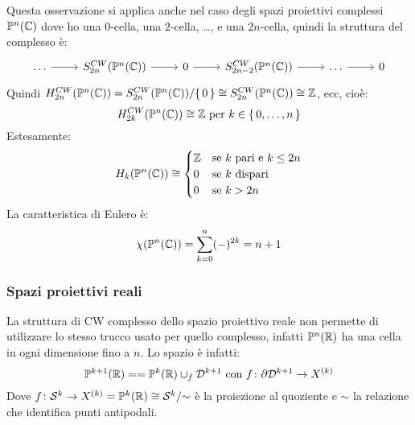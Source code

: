 Questa osservazione si applica anche nel caso degli spazi
proiettivi complessi $ \mathbb{P}^{n} (\mathbb{C}) $ dove ho una $ 0 $-cella, una $ 2 $-cella, \dots, e
una $ 2n $-cella, quindi la struttura del complesso è:
\[
  \begin{tikzcd}
    \dots \rar & S^{CW}_{2n}(\Pjc{n}) \rar & 0 \rar & S_{2n - 2}^{CW}(\Pjc{n}) \rar & \dots \rar & 0
  \end{tikzcd}
\]
Quindi $ H_{2n}^{CW}(\mathbb{P}^{n} (\mathbb{C})) = {S^{CW}_{2n}(\mathbb{P}^{n} (\mathbb{C}))} \slash {\set{0}} \cong S_{2n}^{CW}(\mathbb{P}^{n} (\mathbb{C})) \cong \mathbb{Z} $,
ecc, cioè:
\[
  H_{2k}^{CW}(\mathbb{P}^{n} (\mathbb{C})) \cong \mathbb{Z} \text{ per } k \in \set{0, \dots, n}
\]
Estesamente:
\[
  H_k(\mathbb{P}^{n} (\mathbb{C})) \cong
  \begin{cases}
    \mathbb{Z} & \text{se $ k $ pari e $ k \leq 2n $} \\
    0  & \text{se $ k $ dispari} \\
    0  & \text{se $ k > 2n $ }
  \end{cases}
\]
La caratteristica di Eulero è:
\[
  \chi(\mathbb{P}^{n} (\mathbb{C})) = \sum_{k=0}^n (-)^{2k} = n + 1
\]
\subsubsection{Spazi proiettivi reali}
La struttura di CW complesso dello spazio proiettivo reale non permette
di utilizzare lo stesso trucco usato per quello complesso, infatti $ \mathbb{P}^{n} (\mathbb{R}) $
ha una cella in ogni dimensione fino a $ n $. Lo spazio è infatti:
\[
  \mathbb{P}^{k+1} (\mathbb{R}) = = \mathbb{P}^{k} (\mathbb{R}) \cup_f \mathcal{D}^{k+1} \text{ con } f \colon \partial \mathcal{D}^{k+1} \to X^{(k)}
\]
Dove $ f \colon \mathcal{S}^{k} \to X^{(k)} = \mathbb{P}^{k} (\mathbb{R}) \cong {\mathcal{S}^{k}} \slash {\sim} $ è la proiezione
al quoziente e $ \sim $ la relazione che identifica punti antipodali.


